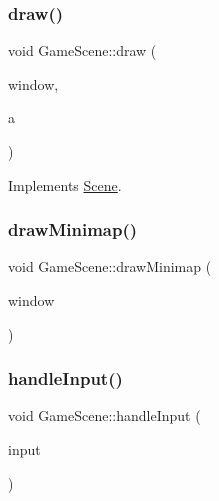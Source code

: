 \mbox{\label{class_game_scene_a78f6d778b147a819ec89f77f3f9a5bc9}} 
\subsubsection{\texorpdfstring{draw()}{draw()}}
{\footnotesize\ttfamily void Game\+Scene\+::draw (\begin{DoxyParamCaption}\item[{sf\+::\+Render\+Window \&}]{window,  }\item[{float}]{a }\end{DoxyParamCaption})\hspace{0.3cm}{\ttfamily [virtual]}}



Implements \mbox{\hyperlink{class_scene_aac0c632404668d9bf71755aaa9c35d51}{Scene}}.

\mbox{\label{class_game_scene_a3dbfed573e480dcd17a28d6a3eddd3f8}} 
\subsubsection{\texorpdfstring{drawMinimap()}{drawMinimap()}}
{\footnotesize\ttfamily void Game\+Scene\+::draw\+Minimap (\begin{DoxyParamCaption}\item[{sf\+::\+Render\+Window \&}]{window }\end{DoxyParamCaption})}

\mbox{\label{class_game_scene_a10042b36b1b586825ff8a37c47e38899}} 
\subsubsection{\texorpdfstring{handleInput()}{handleInput()}}
{\footnotesize\ttfamily void Game\+Scene\+::handle\+Input (\begin{DoxyParamCaption}\item[{\mbox{\hyperlink{class_input_handler}{Input\+Handler}} \&}]{input }\end{DoxyParamCaption})\hspace{0.3cm}{\ttfamily [virtual]}}



